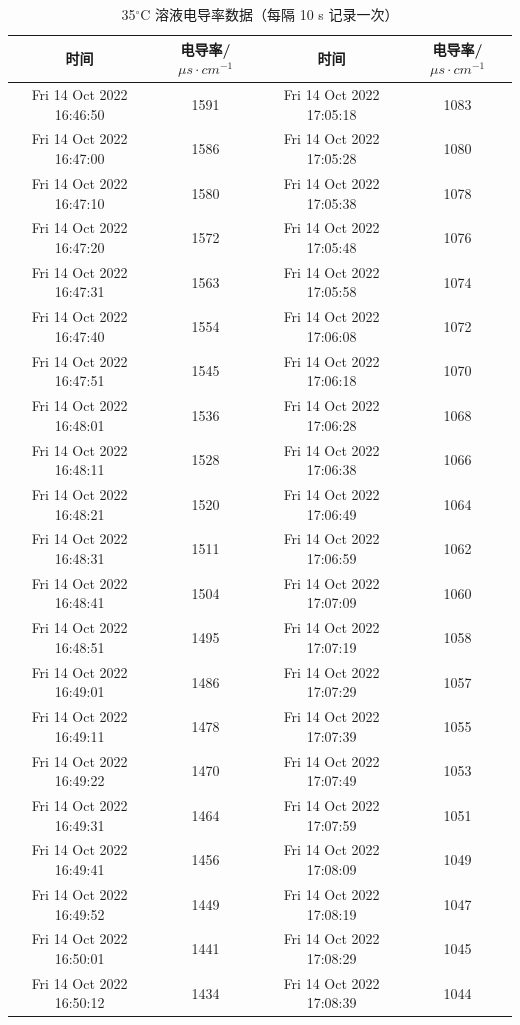 \documentclass[12pt]{ctexart}
\numberwithin{equation}{section}
\begin{document}
\begin{longtable}{cc|cc}
    \caption{35$^\circ$C 溶液电导率数据（每隔 10 s 记录一次）} \\
    \hline
    时间 & 电导率/$\mu s\cdot cm^{-1}$ & 时间 & 电导率/$\mu s\cdot cm^{-1}$ \\
    \hline
    Fri 14 Oct 2022 16:46:50 & 1591 & Fri 14 Oct 2022 17:05:18 & 1083 \\
Fri 14 Oct 2022 16:47:00 & 1586 & Fri 14 Oct 2022 17:05:28 & 1080 \\
Fri 14 Oct 2022 16:47:10 & 1580 & Fri 14 Oct 2022 17:05:38 & 1078 \\
Fri 14 Oct 2022 16:47:20 & 1572 & Fri 14 Oct 2022 17:05:48 & 1076 \\
Fri 14 Oct 2022 16:47:31 & 1563 & Fri 14 Oct 2022 17:05:58 & 1074 \\
Fri 14 Oct 2022 16:47:40 & 1554 & Fri 14 Oct 2022 17:06:08 & 1072 \\
Fri 14 Oct 2022 16:47:51 & 1545 & Fri 14 Oct 2022 17:06:18 & 1070 \\
Fri 14 Oct 2022 16:48:01 & 1536 & Fri 14 Oct 2022 17:06:28 & 1068 \\
Fri 14 Oct 2022 16:48:11 & 1528 & Fri 14 Oct 2022 17:06:38 & 1066 \\
Fri 14 Oct 2022 16:48:21 & 1520 & Fri 14 Oct 2022 17:06:49 & 1064 \\
Fri 14 Oct 2022 16:48:31 & 1511 & Fri 14 Oct 2022 17:06:59 & 1062 \\
Fri 14 Oct 2022 16:48:41 & 1504 & Fri 14 Oct 2022 17:07:09 & 1060 \\
Fri 14 Oct 2022 16:48:51 & 1495 & Fri 14 Oct 2022 17:07:19 & 1058 \\
Fri 14 Oct 2022 16:49:01 & 1486 & Fri 14 Oct 2022 17:07:29 & 1057 \\
Fri 14 Oct 2022 16:49:11 & 1478 & Fri 14 Oct 2022 17:07:39 & 1055 \\
Fri 14 Oct 2022 16:49:22 & 1470 & Fri 14 Oct 2022 17:07:49 & 1053 \\
Fri 14 Oct 2022 16:49:31 & 1464 & Fri 14 Oct 2022 17:07:59 & 1051 \\
Fri 14 Oct 2022 16:49:41 & 1456 & Fri 14 Oct 2022 17:08:09 & 1049 \\
Fri 14 Oct 2022 16:49:52 & 1449 & Fri 14 Oct 2022 17:08:19 & 1047 \\
Fri 14 Oct 2022 16:50:01 & 1441 & Fri 14 Oct 2022 17:08:29 & 1045 \\
Fri 14 Oct 2022 16:50:12 & 1434 & Fri 14 Oct 2022 17:08:39 & 1044 \\

\end{longtable}
\end{document}
